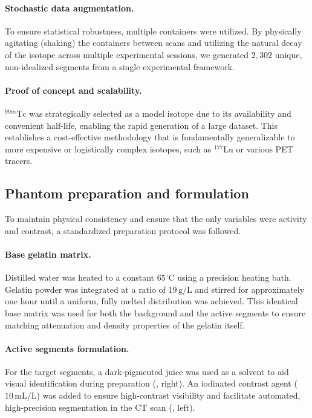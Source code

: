 \paragraph{Stochastic data augmentation.}
To ensure statistical robustness, multiple containers were utilized.
By physically agitating (shaking) the containers between scans and utilizing the natural decay of the isotope across multiple experimental sessions, we generated $2{,}302$ unique, non-idealized segments from a single experimental framework.

\paragraph{Proof of concept and scalability.}
$^{99m}\mathrm{Tc}$ was strategically selected as a model isotope due to its availability and convenient half-life, enabling the rapid generation of a large dataset.
This establishes a cost-effective methodology that is fundamentally generalizable to more expensive or logistically complex isotopes, such as $^{177}\mathrm{Lu}$ or various PET tracers.

\subsection{Phantom preparation and formulation}

To maintain physical consistency and ensure that the only variables were activity and contrast, a standardized preparation protocol was followed.

\paragraph{Base gelatin matrix.}
Distilled water was heated to a constant $65^\circ\mathrm{C}$ using a precision heating bath.
Gelatin powder was integrated at a ratio of $19\,\mathrm{g/L}$ and stirred for approximately one hour until a uniform, fully melted distribution was achieved.
This identical base matrix was used for both the background and the active segments to ensure matching attenuation and density properties of the gelatin itself.

\paragraph{Active segments formulation.}
For the target segments, a dark-pigmented juice was used as a solvent to aid visual identification during preparation (, right).
An iodinated contrast agent ($10\,\mathrm{mL/L}$) was added to ensure high-contrast visibility and facilitate automated, high-precision segmentation in the CT scan (, left).

